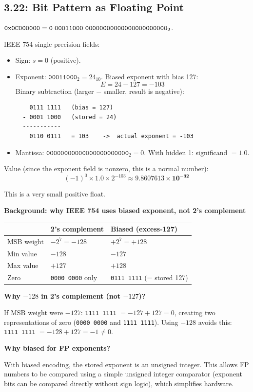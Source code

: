 \subsection*{3.22: Bit Pattern as Floating Point}
\hypertarget{sol-3.22}{}

$\texttt{0x0C000000} = \texttt{0\;00011000\;00000000000000000000000}_2$.

IEEE 754 single precision fields:
\begin{itemize}
  \item Sign: $s = 0$ (positive).
  \item Exponent: $\texttt{00011000}_2 = 24_{10}$.
        Biased exponent with bias 127:
        \[ E = 24 - 127 = -103 \]
        Binary subtraction (larger $-$ smaller, result is negative):
\begin{verbatim}
    0111 1111   (bias = 127)
  - 0001 1000   (stored = 24)
  -----------
    0110 0111   = 103    ->  actual exponent = -103
\end{verbatim}
  \item Mantissa: $\texttt{00000000000000000000000}_2 = 0$.
        With hidden 1: significand $= 1.0$.
\end{itemize}

Value (since the exponent field is nonzero, this is a normal number):
\[
  (-1)^0 \times 1.0 \times 2^{-103} \approx \mathbf{9.8607613 \times 10^{-32}}
\]

This is a very small positive float.

\begin{flushright}
\begin{minipage}{0.92\linewidth}
\scriptsize
\textbf{Background: why IEEE 754 uses biased exponent, not 2's complement}\par\smallskip
\begin{tabular}{@{}l l l@{}}
\toprule
& 2's complement & Biased (excess-127) \\
\midrule
MSB weight & $-2^{7} = -128$ & $+2^{7} = +128$ \\
Min value & $-128$ & $-127$ \\
Max value & $+127$ & $+128$ \\
Zero & \texttt{0000\,0000} only & \texttt{0111\,1111} (= stored 127) \\
\bottomrule
\end{tabular}

\smallskip
\textbf{Why $-128$ in 2's complement (not $-127$)?}\par
If MSB weight were $-127$: \texttt{1111\,1111} $= -127+127 = 0$,
creating two representations of zero (\texttt{0000\,0000} and
\texttt{1111\,1111}). Using $-128$ avoids this:
\texttt{1111\,1111} $= -128+127 = -1 \ne 0$.

\smallskip
\textbf{Why biased for FP exponents?}\par
With biased encoding, the stored exponent is an unsigned integer.
This allows FP numbers to be compared using a simple unsigned integer
comparator (exponent bits can be compared directly without sign logic),
which simplifies hardware.
\end{minipage}
\end{flushright}

